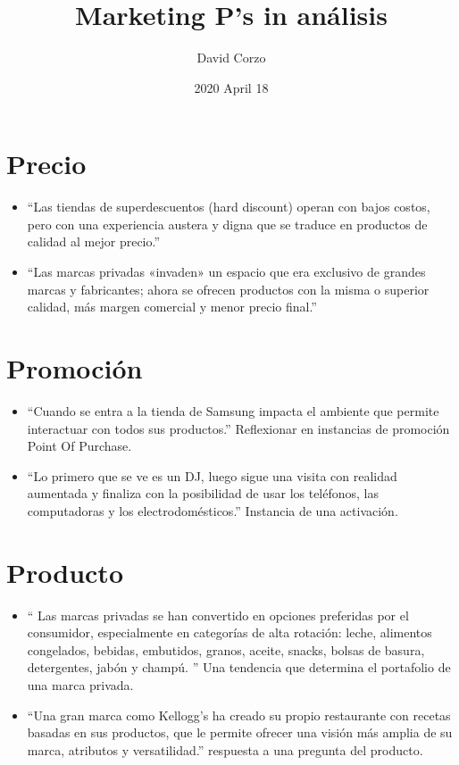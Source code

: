 \documentclass{article}
\title{Marketing P's in análisis}
\date{2020 April 18}
\author{David Corzo}
\begin{document}
\maketitle
\section{Precio}
\begin{itemize}
    \item ``Las tiendas de superdescuentos (hard discount) operan con bajos costos, pero con una experiencia austera y digna que se traduce en productos de calidad al mejor precio.''
    \item ``Las marcas privadas «invaden» un espacio que era exclusivo de grandes marcas y fabricantes; ahora se ofrecen productos con la misma o superior calidad, más margen comercial y menor precio final.''
\end{itemize}

\section{Promoción}
\begin{itemize}
    \item ``Cuando se entra a la tienda de Samsung impacta el ambiente que permite interactuar con todos sus productos.'' Reflexionar en instancias de promoción Point Of Purchase. 
    \item ``Lo primero que se ve es un DJ, luego sigue una visita con realidad aumentada y finaliza con la posibilidad de usar los teléfonos, las computadoras y los electrodomésticos.'' Instancia de una activación. 
\end{itemize}

\section{Producto}
\begin{itemize}
    \item `` Las marcas privadas se han convertido en opciones preferidas por el consumidor, especialmente en categorías de alta rotación: leche, alimentos congelados, bebidas, embutidos, granos, aceite, snacks, bolsas de basura, detergentes, jabón y champú. '' Una tendencia que determina el portafolio de una marca privada.
    \item ``Una gran marca como Kellogg’s ha creado su propio restaurante con recetas basadas en sus productos, que le permite ofrecer una visión más amplia de su marca, atributos y versatilidad.'' respuesta a una pregunta del producto. 
\end{itemize}
\end{document}

